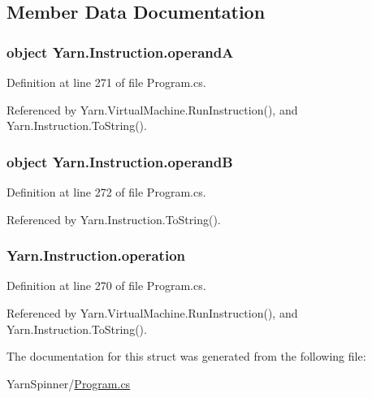 \subsection{Member Data Documentation}
\hypertarget{a00119_ab5d386faa0d3dbc23db80f8e62706afd}{
\subsubsection[{operand\-A}]{\setlength{\rightskip}{0pt plus 5cm}object Yarn.\-Instruction.\-operand\-A}}\label{a00119_ab5d386faa0d3dbc23db80f8e62706afd}


Definition at line 271 of file Program.\-cs.



Referenced by Yarn.\-Virtual\-Machine.\-Run\-Instruction(), and Yarn.\-Instruction.\-To\-String().

\hypertarget{a00119_a56348c6fe7eb919b7277afc06e5b224a}{
\subsubsection[{operand\-B}]{\setlength{\rightskip}{0pt plus 5cm}object Yarn.\-Instruction.\-operand\-B}}\label{a00119_a56348c6fe7eb919b7277afc06e5b224a}


Definition at line 272 of file Program.\-cs.



Referenced by Yarn.\-Instruction.\-To\-String().

\hypertarget{a00119_a566bf5f7198cc353ea5c3710cb3a31cb}{
\subsubsection[{operation}]{ Yarn.\-Instruction.\-operation}}\label{a00119_a566bf5f7198cc353ea5c3710cb3a31cb}


Definition at line 270 of file Program.\-cs.



Referenced by Yarn.\-Virtual\-Machine.\-Run\-Instruction(), and Yarn.\-Instruction.\-To\-String().



The documentation for this struct was generated from the following file\-:\begin{DoxyCompactItemize}
\item 
Yarn\-Spinner/\hyperlink{a00314}{Program.\-cs}\end{DoxyCompactItemize}
